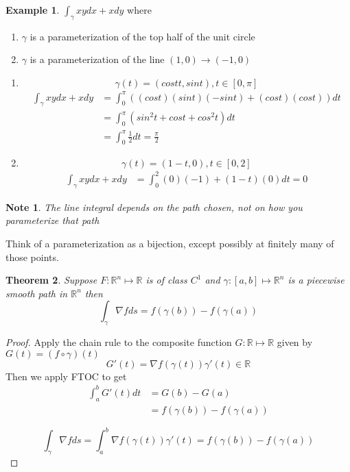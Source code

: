 \documentclass[12pt]{article}
\theoremstyle{plain}
\newtheorem*{note}{Note}
\newtheorem{theorem}{Theorem}[section]
\theoremstyle{definition}
\newtheorem{example}[theorem]{Example}
\begin{document}
\begin{example}
	$\int_\gamma xy dx + xdy$ where
	\begin{enumerate}
		\item{$\gamma$ is a parameterization of the top half of the unit circle}
		\item{$\gamma$ is a parameterization of the line $(1,0) \to (-1,0)$}
	\end{enumerate}

	\begin{enumerate}
	\item{
		$$\gamma (t) = (cost t, sin t), t \in [0,\pi]$$
		\begin{align*}
			\int_\gamma xy dx + xdy &= \int^\pi_0 ((cost)(sint)(-sint) + (cost)(cost))dt\\
			&= \int^\pi_0 (sin^2 t + cost + cos^2 t) dt\\
			&= \int^\pi_0 \frac{1}{2} dt = \frac{\pi}{2}
		\end{align*}

	}
	\item{
	$$\gamma (t) = (1-t,0), t\in [0,2]$$
		\begin{align*}
			\int_\gamma xy dx + xdy &= \int^2_0 (0)(-1) + (1-t)(0)dt = 0
		\end{align*}

	}
	\end{enumerate}
\end{example}

\begin{note}
	The line integral depends on the path chosen, not on how you parameterize that path
\end{note}

Think of a parameterization as a bijection, except possibly at finitely many of those points.

\begin{theorem}
	Suppose $F:\mathbb{R}^n \mapsto \mathbb{R}$ is of class $C^1$ and $\gamma: [a,b] \mapsto \mathbb{R}^n$ is a piecewise smooth path in $\mathbb{R}^n$ then
	$$\int_\gamma \nabla f ds = f(\gamma(b)) - f(\gamma(a))$$
\end{theorem}

\begin{proof}
	Apply the chain rule to the composite function $G:\mathbb{R} \mapsto \mathbb{R}$ given by $G(t) = (f \circ \gamma)(t)$
	$$G'(t) = \nabla f(\gamma(t)) \gamma '(t) \in \mathbb{R}$$
	Then we apply FTOC to get
	\begin{align*}
		\int^b_a G'(t) dt &= G(b) - G(a)\\
		&= f(\gamma(b)) - f(\gamma(a))
	\end{align*}

	$$\int_\gamma \nabla f ds = \int^b_a \nabla f(\gamma(t)) \gamma '(t) = f(\gamma(b)) - f(\gamma(a))$$

\end{proof}
\end{document}

